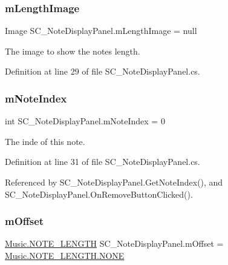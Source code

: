 \subsubsection{\texorpdfstring{m\+Length\+Image}{mLengthImage}}
{\footnotesize\ttfamily Image S\+C\+\_\+\+Note\+Display\+Panel.\+m\+Length\+Image = null\hspace{0.3cm}{\ttfamily [private]}}



The image to show the note\textquotesingle{}s length. 



Definition at line 29 of file S\+C\+\_\+\+Note\+Display\+Panel.\+cs.

\mbox{\label{group___s_c___n_d_p_priv_var_ga11933919195aba904a4e8bf95f131e49}} 
\subsubsection{\texorpdfstring{m\+Note\+Index}{mNoteIndex}}
{\footnotesize\ttfamily int S\+C\+\_\+\+Note\+Display\+Panel.\+m\+Note\+Index = 0\hspace{0.3cm}{\ttfamily [private]}}



The inde of this note. 



Definition at line 31 of file S\+C\+\_\+\+Note\+Display\+Panel.\+cs.



Referenced by S\+C\+\_\+\+Note\+Display\+Panel.\+Get\+Note\+Index(), and S\+C\+\_\+\+Note\+Display\+Panel.\+On\+Remove\+Button\+Clicked().

\mbox{\label{group___s_c___n_d_p_priv_var_ga0a78a2c25da29d944d56d1c8ebb74d03}} 
\subsubsection{\texorpdfstring{m\+Offset}{mOffset}}
{\footnotesize\ttfamily \hyperlink{group___music_enums_gaf11b5f079adbb21c800b9eca1c5c3cbd}{Music.\+N\+O\+T\+E\+\_\+\+L\+E\+N\+G\+TH} S\+C\+\_\+\+Note\+Display\+Panel.\+m\+Offset = \hyperlink{group___music_enums_ggaf11b5f079adbb21c800b9eca1c5c3cbdab50339a10e1de285ac99d4c3990b8693}{Music.\+N\+O\+T\+E\+\_\+\+L\+E\+N\+G\+T\+H.\+N\+O\+NE}\hspace{0.3cm}{\ttfamily [private]}}



